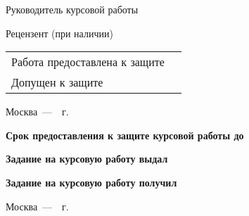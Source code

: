 \documentclass[14pt, a4paper, titlepage]{extarticle}
\begin{document}
\begin{titlepage}
    Руководитель курсовой работы  \hfill{} \bigskip\par
    Рецензент (при наличии)  \hfill{} \bigskip\par
    \begin{tabular}{@{}ll}
        Работа предоставлена к защите & \blankDate{}{} \bigskip\\
        Допущен к защите & \blankDate{}{}
    \end{tabular}
    \begin{center}
        \vfill Москва~---~\the\year{}~г.
    \end{center}
    \newpage
    \textbf{Срок предоставления к защите курсовой работы до} \hfill\blankDate{}{} \par
    \textbf{Задание на курсовую работу выдал}  \hfill{} \par
    \hfill\blankDate{}{} \par
    \textbf{Задание на курсовую работу получил}  \hfill{} \par\bigskip
    \begin{center}
        Москва~---~\the\year{}~г.
    \end{center}
\end{titlepage}
\addtocounter{page}{2}
\end{document}
